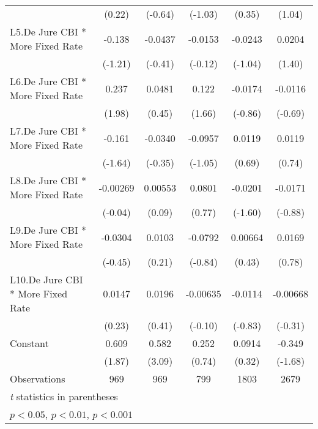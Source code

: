{\begin{tabular}{l*{5}{c}}
                                        &    (0.22)         &   (-0.64)         &   (-1.03)         &    (0.35)         &    (1.04)         \\
\addlinespace
L5.De Jure CBI * More Fixed Rate        &    -0.138         &   -0.0437         &   -0.0153         &   -0.0243         &    0.0204         \\
                                        &   (-1.21)         &   (-0.41)         &   (-0.12)         &   (-1.04)         &    (1.40)         \\
\addlinespace
L6.De Jure CBI * More Fixed Rate        &     0.237\sym{*}  &    0.0481         &     0.122         &   -0.0174         &   -0.0116         \\
                                        &    (1.98)         &    (0.45)         &    (1.66)         &   (-0.86)         &   (-0.69)         \\
\addlinespace
L7.De Jure CBI * More Fixed Rate        &    -0.161         &   -0.0340         &   -0.0957         &    0.0119         &    0.0119         \\
                                        &   (-1.64)         &   (-0.35)         &   (-1.05)         &    (0.69)         &    (0.74)         \\
\addlinespace
L8.De Jure CBI * More Fixed Rate        &  -0.00269         &   0.00553         &    0.0801         &   -0.0201         &   -0.0171         \\
                                        &   (-0.04)         &    (0.09)         &    (0.77)         &   (-1.60)         &   (-0.88)         \\
\addlinespace
L9.De Jure CBI * More Fixed Rate        &   -0.0304         &    0.0103         &   -0.0792         &   0.00664         &    0.0169         \\
                                        &   (-0.45)         &    (0.21)         &   (-0.84)         &    (0.43)         &    (0.78)         \\
\addlinespace
L10.De Jure CBI * More Fixed Rate       &    0.0147         &    0.0196         &  -0.00635         &   -0.0114         &  -0.00668         \\
                                        &    (0.23)         &    (0.41)         &   (-0.10)         &   (-0.83)         &   (-0.31)         \\
\addlinespace
Constant                                &     0.609         &     0.582\sym{**} &     0.252         &    0.0914         &    -0.349         \\
                                        &    (1.87)         &    (3.09)         &    (0.74)         &    (0.32)         &   (-1.68)         \\
\midrule
Observations                            &       969         &       969         &       799         &      1803         &      2679         \\
\bottomrule
\multicolumn{6}{l}{\footnotesize \textit{t} statistics in parentheses}\\
\multicolumn{6}{l}{\footnotesize \sym{*} \(p<0.05\), \sym{**} \(p<0.01\), \sym{***} \(p<0.001\)}\\
\end{tabular}
}
